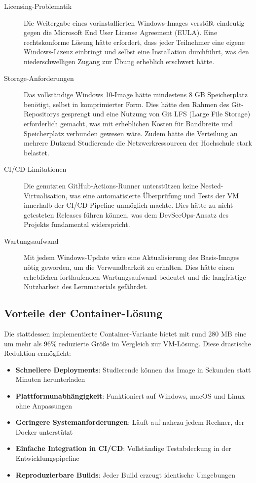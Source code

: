 \documentclass{article}
\begin{document}
\begin{description}
  \item[Licensing-Problematik] Die Weitergabe eines vorinstallierten Windows-Images verstößt eindeutig gegen die Microsoft End User License Agreement (EULA). Eine rechtskonforme Lösung hätte erfordert, dass jeder Teilnehmer eine eigene Windows-Lizenz einbringt und selbst eine Installation durchführt, was den niederschwelligen Zugang zur Übung erheblich erschwert hätte.
  
  \item[Storage-Anforderungen] Das vollständige Windows 10-Image hätte mindestens 8 GB Speicherplatz benötigt, selbst in komprimierter Form. Dies hätte den Rahmen des Git-Repositorys gesprengt und eine Nutzung von Git LFS (Large File Storage) erforderlich gemacht, was mit erheblichen Kosten für Bandbreite und Speicherplatz verbunden gewesen wäre. Zudem hätte die Verteilung an mehrere Dutzend Studierende die Netzwerkressourcen der Hochschule stark belastet.
  
  \item[CI/CD-Limitationen] Die genutzten GitHub-Actions-Runner unterstützen keine Nested-Virtualisation, was eine automatisierte Überprüfung und Tests der VM innerhalb der CI/CD-Pipeline unmöglich machte. Dies hätte zu nicht getesteten Releases führen können, was dem DevSecOps-Ansatz des Projekts fundamental widerspricht.
  
  \item[Wartungsaufwand] Mit jedem Windows-Update wäre eine Aktualisierung des Basis-Images nötig geworden, um die Verwundbarkeit zu erhalten. Dies hätte einen erheblichen fortlaufenden Wartungsaufwand bedeutet und die langfristige Nutzbarkeit des Lernmaterials gefährdet.
\end{description}

\subsection{Vorteile der Container-Lösung}
Die stattdessen implementierte Container-Variante bietet mit rund 280 MB eine um mehr als 96\% reduzierte Größe im Vergleich zur VM-Lösung. 
Diese drastische Reduktion ermöglicht:

\begin{itemize}
  \item \textbf{Schnellere Deployments}: Studierende können das Image in Sekunden statt Minuten herunterladen
  \item \textbf{Plattformunabhängigkeit}: Funktioniert auf Windows, macOS und Linux ohne Anpassungen
  \item \textbf{Geringere Systemanforderungen}: Läuft auf nahezu jedem Rechner, der Docker unterstützt
  \item \textbf{Einfache Integration in CI/CD}: Vollständige Testabdeckung in der Entwicklungspipeline
  \item \textbf{Reproduzierbare Builds}: Jeder Build erzeugt identische Umgebungen
\end{itemize}
\end{document}
